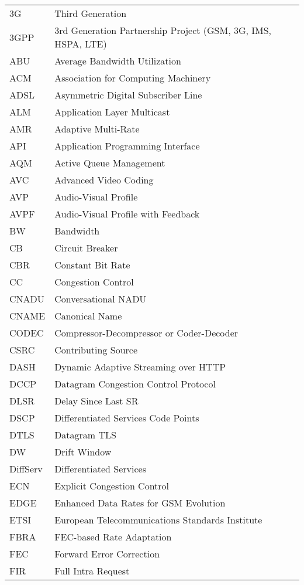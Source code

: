 \begin{longtable}{ll}
3G  	& Third Generation \\
3GPP 	& 3rd Generation Partnership Project (GSM, 3G, IMS, HSPA, LTE)\\
ABU 	& Average Bandwidth Utilization \\
ACM 	& Association for Computing Machinery \\
ADSL 	& Asymmetric Digital Subscriber Line \\
ALM 	& Application Layer Multicast \\
AMR 	& Adaptive Multi-Rate \\
API 	& Application Programming Interface \\
AQM 	& Active Queue Management \\
AVC 	& Advanced Video Coding \\
AVP 	& Audio-Visual Profile \\
AVPF	& Audio-Visual Profile with Feedback \\
BW  	& Bandwidth \\
CB  	& Circuit Breaker \\
CBR 	& Constant Bit Rate \\
CC  	& Congestion Control \\
CNADU	& Conversational NADU \\
CNAME	& Canonical Name \\
CODEC	& Compressor-Decompressor or Coder-Decoder \\
CSRC 	& Contributing Source \\
DASH 	& Dynamic Adaptive Streaming over HTTP \\
DCCP 	& Datagram Congestion Control Protocol \\
DLSR 	& Delay Since Last SR \\
DSCP 	& Differentiated Services Code Points \\
DTLS 	& Datagram TLS \\
DW  	& Drift Window \\
DiffServ	& Differentiated Services \\
ECN  	& Explicit Congestion Control \\
EDGE 	& Enhanced Data Rates for GSM Evolution \\
ETSI 	& European Telecommunications Standards Institute \\
FBRA 	& FEC-based Rate Adaptation \\
FEC  	& Forward Error Correction \\
FIR 	& Full Intra Request \\

\end{longtable}
